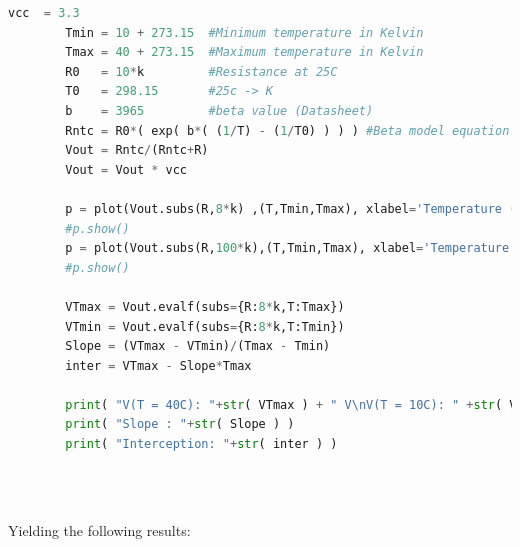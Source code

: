 \documentclass[12pt]{article}
\begin{document}
    \begin{lstlisting}[language=Python]
        vcc  = 3.3 
        Tmin = 10 + 273.15  #Minimum temperature in Kelvin
        Tmax = 40 + 273.15  #Maximum temperature in Kelvin
        R0   = 10*k         #Resistance at 25C
        T0   = 298.15       #25c -> K
        b    = 3965         #beta value (Datasheet)
        Rntc = R0*( exp( b*( (1/T) - (1/T0) ) ) ) #Beta model equation
        Vout = Rntc/(Rntc+R)
        Vout = Vout * vcc
        
        p = plot(Vout.subs(R,8*k) ,(T,Tmin,Tmax), xlabel='Temperature (K)', ylabel='$V_{out}$', title='Output Voltage vs Temperature (8k$\\Omega$)',show=False,axis_center=(282,1.3))
        #p.show()
        p = plot(Vout.subs(R,100*k),(T,Tmin,Tmax), xlabel='Temperature (K)', ylabel='$V_{out}$', title='Output Voltage vs Temperature (100k$\\Omega$)',show=False,axis_center=(282,0.15))
        #p.show()

        VTmax = Vout.evalf(subs={R:8*k,T:Tmax})
        VTmin = Vout.evalf(subs={R:8*k,T:Tmin})
        Slope = (VTmax - VTmin)/(Tmax - Tmin)
        inter = VTmax - Slope*Tmax

        print( "V(T = 40C): "+str( VTmax ) + " V\nV(T = 10C): " +str( VTmin )+" V" )
        print( "Slope : "+str( Slope ) )
        print( "Interception: "+str( inter ) )
        
    \end{lstlisting}
    ~
    
    Yielding the following results:
    
    ~

\end{document}
